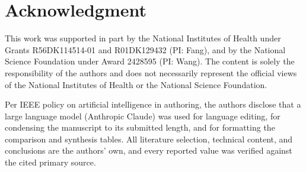 \documentclass[journal]{IEEEtran}
\begin{document}
\fi

\section*{Acknowledgment}
This work was supported in part by the National Institutes of Health under Grants R56DK114514-01 and R01DK129432 (PI: Fang), and by the National Science Foundation under Award 2428595 (PI: Wang). The content is solely the responsibility of the authors and does not necessarily represent the official views of the National Institutes of Health or the National Science Foundation.

Per IEEE policy on artificial intelligence in authoring, the authors disclose that a large language model (Anthropic Claude) was used for language editing, for condensing the manuscript to its submitted length, and for formatting the comparison and synthesis tables. All literature selection, technical content, and conclusions are the authors' own, and every reported value was verified against the cited primary source.



\end{document}
